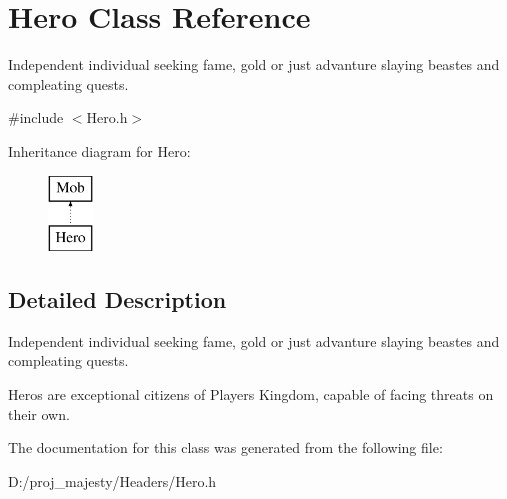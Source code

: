 \hypertarget{class_hero}{}\section{Hero Class Reference}
\label{class_hero}


Independent individual seeking fame, gold or just advanture slaying beastes and compleating quests.  




{\ttfamily \#include $<$Hero.\+h$>$}

Inheritance diagram for Hero\+:\begin{figure}[H]
\begin{center}
\leavevmode
\includegraphics[height=2.000000cm]{class_hero}
\end{center}
\end{figure}


\subsection{Detailed Description}
Independent individual seeking fame, gold or just advanture slaying beastes and compleating quests. 

Heros are exceptional citizens of Player\textquotesingle{}s Kingdom, capable of facing threats on their own. 

The documentation for this class was generated from the following file\+:\begin{DoxyCompactItemize}
\item 
D\+:/proj\+\_\+majesty/\+Headers/Hero.\+h\end{DoxyCompactItemize}
